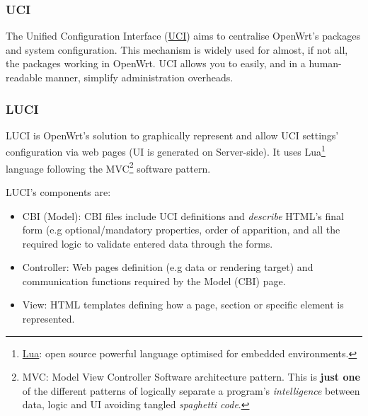 \subsubsection{UCI}
The Unified Configuration Interface (\href{https://wiki.openwrt.org/doc/uci}{UCI}) aims to centralise OpenWrt's packages and system configuration. This mechanism is widely used for almost, if not all, the packages working in OpenWrt. UCI allows you to easily, and in a human-readable manner, simplify administration overheads.

\subsubsection{LUCI}
LUCI is OpenWrt's solution to graphically represent and allow UCI settings' configuration via web pages (UI is generated on Server-side). It uses Lua\footnote{\href{https://www.lua.org/manual/5.1/}{Lua}: open source powerful language optimised for embedded environments.} language following the MVC\footnote{MVC: Model View Controller Software architecture pattern. This is \textbf{just one} of the different patterns of logically separate a program's \textit{intelligence} between data, logic and UI avoiding tangled \textit{spaghetti code}.} software pattern.

LUCI's components are:
\begin{itemize}
    \item CBI (Model): CBI files include UCI definitions and \textit{describe} HTML's final form (e.g optional/mandatory properties, order of apparition, and all the required logic to validate entered data through the forms.
    \item Controller: Web pages definition (e.g data or rendering target) and communication functions required by the Model (CBI) page.
    \item View: HTML templates defining how a page, section or specific element is represented.
\end{itemize}

